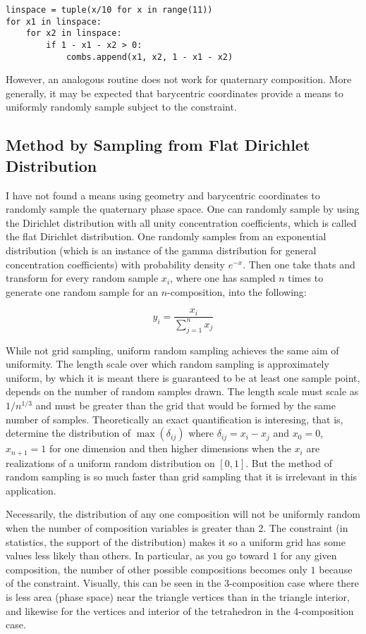 \documentclass{article}
\begin{document}
\begin{lstlisting}
linspace = tuple(x/10 for x in range(11))
for x1 in linspace:
    for x2 in linspace:
        if 1 - x1 - x2 > 0:
            combs.append(x1, x2, 1 - x1 - x2)
\end{lstlisting}

However, an analogous routine does not work for quaternary
composition. More generally, it may be expected that barycentric
coordinates provide a means to uniformly randomly sample subject to the
constraint.

\subsection{Method by Sampling from Flat Dirichlet Distribution}

I have not found a means using geometry and barycentric coordinates to randomly
sample the quaternary phase space. One can randomly sample by using the
Dirichlet distribution with all unity concentration coefficients, which is
called the flat Dirichlet distribution. One randomly samples from an exponential
distribution (which is an instance of the gamma distribution for general
concentration coefficients) with probability density $e^{-x}$. Then one take
thats and transform for every random sample $x_i$, where one has sampled $n$
times to generate one random sample for an $n$-composition, into the following:

\begin{equation}
y_i = \frac{x_i}{\sum_{j=1}^n x_j}
\end{equation}

While not grid sampling, uniform random sampling achieves the same aim of
uniformity. The length scale over which random sampling is approximately
uniform, by which it is meant there is guaranteed to be at least one sample
point, depends on the number of random samples drawn. The length scale must
scale as $1/n^{1/3}$ and must be greater than the grid that would be formed by
the same number of samples. Theoretically an exact quantification is
interesing, that is, determine the distribution of $\max(\delta_{ij})$ where
$\delta_{ij} = x_i - x_j$ and $x_0 = 0$, $x_{n+1} = 1$ for one dimension and
then higher dimensions when the $x_i$ are realizations of a uniform random
distribution on $[0, 1]$.  But the method of random sampling is so much faster
than grid sampling that it is irrelevant in this application.

Necessarily, the distribution of any one composition will not be
uniformly random when the number of composition variables is greater
than 2. The constraint (in statistics, the support of the distribution)
makes it so a uniform grid has some values less likely than others. In
particular, as you go toward $1$ for any given composition, the
number of other possible compositions becomes only $1$ because of the
constraint. Visually, this can be seen in the 3-composition case where
there is less area (phase space) near the triangle vertices than in the
triangle interior, and likewise for the vertices and interior of the
tetrahedron in the 4-composition case.
\end{document}
